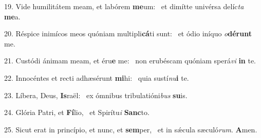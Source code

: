 19. Vide humilitátem meam, et labórem \textbf{me}um: \ast\  et dimítte univérsa delíc\textit{ta} \textbf{me}a.\

20. Réspice inimícos meos quóniam multipli\textbf{cá}ti sunt: \ast\  et ódio iníquo \textit{o}\textbf{dé}\textbf{runt} me.\

21. Custódi ánimam meam, et éru\textbf{e} me: \ast\  non erubéscam quóniam sperá\textit{vi} \textbf{in} te.\

22. Innocéntes et recti adhæsérunt \textbf{mi}hi: \ast\  quia sustí\textit{nu}\textbf{i} te.\

23. Líbera, Deus, \textbf{Is}raël: \ast\  ex ómnibus tribulatióni\textit{bus} \textbf{su}is.\

24. Glória Patri, et \textbf{Fí}lio, \ast\  et Spirítu\textit{i} \textbf{Sanc}to.\

25. Sicut erat in princípio, et nunc, et \textbf{sem}per, \ast\  et in sǽcula sæculó\textit{rum}. \textbf{A}men.\

